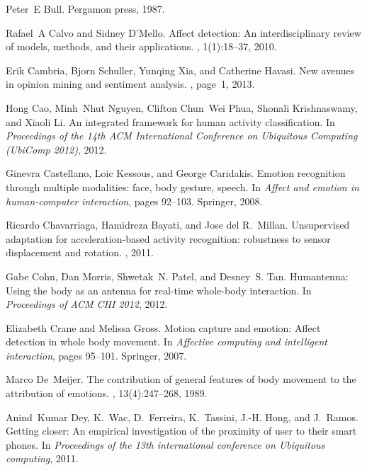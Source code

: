 \documentclass[12pt]{article}
\begin{document}
\begin{small}
\begin{thebibliography}{10}
Peter~E Bull.
\newblock Pergamon press, 1987.

Rafael~A Calvo and Sidney D'Mello.
\newblock Affect detection: An interdisciplinary review of models, methods, and
  their applications.
, 1(1):18--37, 2010.

Erik Cambria, Bjorn Schuller, Yunqing Xia, and Catherine Havasi.
\newblock New avenues in opinion mining and sentiment analysis.
, page~1, 2013.

Hong Cao, Minh~Nhut Nguyen, Clifton Chun~Wei Phua, Shonali Krishnaswamy, and
  Xiaoli Li.
\newblock An integrated framework for human activity classification.
\newblock In {\em Proceedings of the 14th ACM International Conference on
  Ubiquitous Computing (UbiComp 2012)}, 2012.

Ginevra Castellano, Loic Kessous, and George Caridakis.
\newblock Emotion recognition through multiple modalities: face, body gesture,
  speech.
\newblock In {\em Affect and emotion in human-computer interaction}, pages
  92--103. Springer, 2008.

Ricardo Chavarriaga, Hamidreza Bayati, and Jose del R.~Millan.
\newblock Unsupervised adaptation for acceleration-based activity recognition:
  robustness to sensor displacement and rotation.
, 2011.

Gabe Cohn, Dan Morris, Shwetak~N. Patel, and Desney~S. Tan.
\newblock Humantenna: Using the body as an antenna for real-time whole-body
  interaction.
\newblock In {\em Proceedings of ACM CHI 2012}, 2012.

Elizabeth Crane and Melissa Gross.
\newblock Motion capture and emotion: Affect detection in whole body movement.
\newblock In {\em Affective computing and intelligent interaction}, pages
  95--101. Springer, 2007.

Marco De~Meijer.
\newblock The contribution of general features of body movement to the
  attribution of emotions.
, 13(4):247--268, 1989.

Anind~Kumar Dey, K.~Wac, D.~Ferreira, K.~Tassini, J.-H. Hong, and J.~Ramos.
\newblock Getting closer: An empirical investigation of the proximity of user
  to their smart phones.
\newblock In {\em Proceedings of the 13th international conference on
  Ubiquitous computing}, 2011.


\end{thebibliography}
\end{small}
\end{document}

